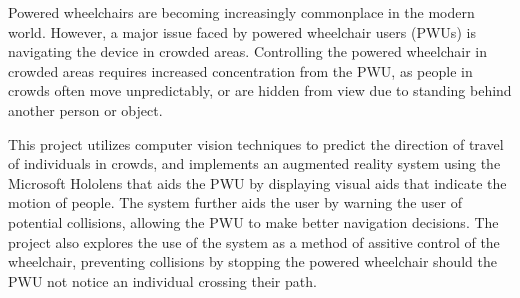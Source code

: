Powered wheelchairs are becoming increasingly commonplace in the modern world. However, a major issue faced by powered wheelchair users (PWUs) is navigating the device in crowded areas. Controlling the powered wheelchair in crowded areas requires increased concentration from the PWU, as people in crowds often move unpredictably, or are hidden from view due to standing behind another person or object.

This project utilizes computer vision techniques to predict the direction of travel of individuals in crowds, and implements an augmented reality system using the Microsoft Hololens that aids the PWU by displaying visual aids that indicate the motion of people. The system further aids the user by warning the user of potential collisions, allowing the PWU to make better navigation decisions. The project also explores the use of the system as a method of assitive control of the wheelchair, preventing collisions by stopping the powered wheelchair should the PWU not notice an individual crossing their path.